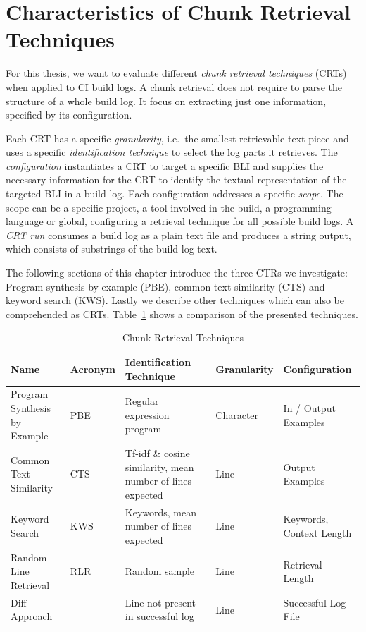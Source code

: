 \documentclass[\myrootdir/main.tex]{subfiles}
\begin{document}
\section{Characteristics of Chunk Retrieval Techniques}
\label{sec:blirt}
For this thesis, we want to evaluate different \emph{chunk retrieval techniques} (CRTs) when applied to CI build logs.
A chunk retrieval does not require to parse the structure of a whole build log.
It focus on extracting just one information, specified by its configuration.

Each CRT has a specific \textit{granularity}, i.e.\ the smallest retrievable text piece and uses a specific \textit{identification technique} to select the log parts it retrieves.
The \textit{configuration} instantiates a CRT to target a specific BLI and supplies the necessary information for the CRT to identify the textual representation of the targeted BLI in a build log.
Each configuration addresses a specific \textit{scope}.
The scope can be a specific project, a tool involved in the build, a programming language or global, configuring a retrieval technique for all possible build logs.
A \textit{CRT run} consumes a build log as a plain text file and produces a string output, which consists of substrings of the build log text.

The following sections of this chapter introduce the three CTRs we investigate: Program synthesis by example (PBE), common text similarity (CTS) and keyword search (KWS).
Lastly we describe other techniques which can also be comprehended as CRTs.
Table~\ref{tab:ctr} shows a comparison of the presented techniques.

\begin{table}[htbp]
\centering
\caption{Chunk Retrieval Techniques}
\begin{tabularx}{\textwidth}{|X|l|X|l|X|} 
\hline
Name                         & Acronym & Identification Technique                                   & Granularity & Configuration             \\ 
\hline
\hline
Program Synthesis by Example & PBE     & Regular expression program                                 & Character   & In / Output Examples      \\
\hline
Common Text Similarity       & CTS     & Tf-idf \& cosine similarity, mean number of lines expected & Line        & Output Examples           \\
\hline
Keyword Search               & KWS     & Keywords, mean number of lines expected                    & Line        & Keywords, Context Length  \\
\hline
Random Line Retrieval        & RLR     & Random sample                                              & Line        & Retrieval Length          \\
\hline
Diff Approach                &         & Line not present in successful log                         & Line        & Successful Log File       \\
\hline
\end{tabularx}
\label{tab:ctr}
\end{table}
\end{document}
